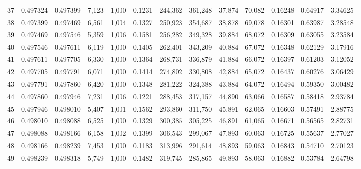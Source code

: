 \begin{tabular}{rrrrrrrrrrrrr}
37  &  0.497324 &  0.497399 &  7,123 &  1,000 &                                     0.1231 &  244,362 &  361,248 &   37,874 &   70,082 &  0.16248 &  0.64917 &  3.34625 \\
38  &  0.497399 &  0.497469 &  6,561 &  1,004 &                                     0.1327 &  250,923 &  354,687 &   38,878 &   69,078 &  0.16301 &  0.63987 &  3.28548 \\
39  &  0.497469 &  0.497546 &  5,359 &  1,006 &                                     0.1581 &  256,282 &  349,328 &   39,884 &   68,072 &  0.16309 &  0.63055 &  3.23584 \\
40  &  0.497546 &  0.497611 &  6,119 &  1,000 &                                     0.1405 &  262,401 &  343,209 &   40,884 &   67,072 &  0.16348 &  0.62129 &  3.17916 \\
41  &  0.497611 &  0.497705 &  6,330 &  1,000 &                                     0.1364 &  268,731 &  336,879 &   41,884 &   66,072 &  0.16397 &  0.61203 &  3.12052 \\
42  &  0.497705 &  0.497791 &  6,071 &  1,000 &                                     0.1414 &  274,802 &  330,808 &   42,884 &   65,072 &  0.16437 &  0.60276 &  3.06429 \\
43  &  0.497791 &  0.497860 &  6,420 &  1,000 &                                     0.1348 &  281,222 &  324,388 &   43,884 &   64,072 &  0.16494 &  0.59350 &  3.00482 \\
44  &  0.497860 &  0.497946 &  7,231 &  1,006 &                                     0.1221 &  288,453 &  317,157 &   44,890 &   63,066 &  0.16587 &  0.58418 &  2.93784 \\
45  &  0.497946 &  0.498010 &  5,407 &  1,001 &                                     0.1562 &  293,860 &  311,750 &   45,891 &   62,065 &  0.16603 &  0.57491 &  2.88775 \\
46  &  0.498010 &  0.498088 &  6,525 &  1,000 &                                     0.1329 &  300,385 &  305,225 &   46,891 &   61,065 &  0.16671 &  0.56565 &  2.82731 \\
47  &  0.498088 &  0.498166 &  6,158 &  1,002 &                                     0.1399 &  306,543 &  299,067 &   47,893 &   60,063 &  0.16725 &  0.55637 &  2.77027 \\
48  &  0.498166 &  0.498239 &  7,453 &  1,000 &                                     0.1183 &  313,996 &  291,614 &   48,893 &   59,063 &  0.16843 &  0.54710 &  2.70123 \\
49  &  0.498239 &  0.498318 &  5,749 &  1,000 &                                     0.1482 &  319,745 &  285,865 &   49,893 &   58,063 &  0.16882 &  0.53784 &  2.64798 \\

\end{tabular}

